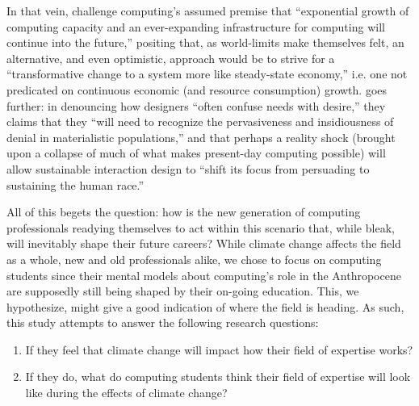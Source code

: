 In that vein, \citet{nardiComputingLimits2018} challenge computing's assumed premise that ``exponential growth of computing capacity and an ever-expanding infrastructure for computing will continue into the future,'' positing that, as world-limits make themselves felt, an alternative, and even optimistic, approach would be to strive for a ``transformative change to a system more like steady-state economy,'' i.e. one not predicated on continuous economic (and resource consumption) growth. 
\citet{wong2009prepare} goes further: in denouncing how designers ``often confuse needs with desire,'' they claims that they ``will need to recognize the pervasiveness and insidiousness of denial in materialistic populations,'' and that perhaps a reality shock (brought upon a collapse of much of what makes present-day computing possible) will allow sustainable interaction design to ``shift its focus from persuading to sustaining the human race.''

All of this begets the question: how is the new generation of computing professionals readying themselves to act within this scenario that, while bleak, will inevitably shape their future careers? While climate change affects the field as a whole, new and old professionals alike, we chose to focus on computing students since their mental models about computing's role in the Anthropocene are supposedly still being shaped by their on-going education. This, we hypothesize, might give a good indication of where the field is heading. As such, this study attempts to answer the following research questions:

\begin{enumerate}
    \item If they feel that climate change will impact how their field of expertise works?
    \item If they do, what do computing students think their field of expertise will look like during the effects of climate change?
\end{enumerate}